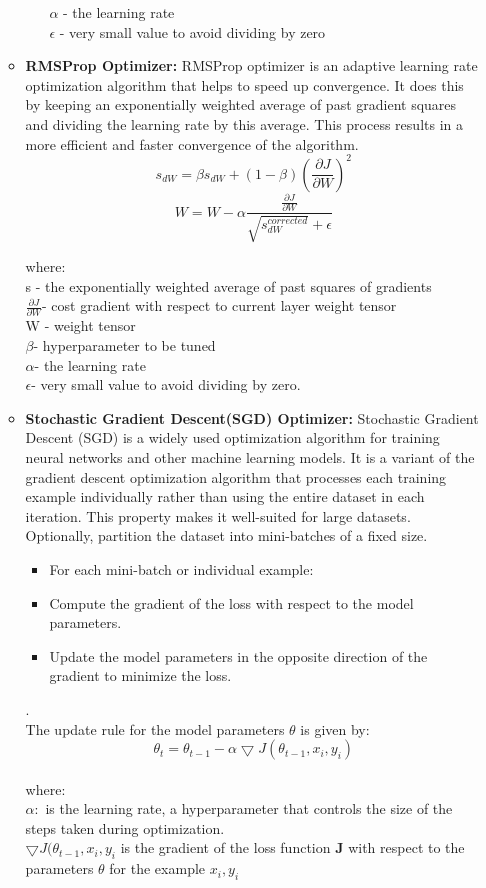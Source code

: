 \begin{itemize}
\begin{itemize}
\begin{itemize}
        $\alpha$ - the learning rate\\
        $\epsilon$ - very small value to avoid dividing by zero\\
    \end{itemize}
    \item \textbf{RMSProp Optimizer: } RMSProp optimizer is an adaptive learning rate optimization algorithm that helps to speed up convergence. It does this by keeping an exponentially weighted average of past gradient squares and dividing the learning rate by this average. This process results in a more efficient and faster convergence of the algorithm.
    \[
    s_{dW} = \beta s_{dW} + (1-\beta)\left(\frac{\partial J}{\partial W}\right)^{2}
    \]
    \[
    W = W-\alpha\frac{\frac{\partial J}{\partial W}}{\sqrt{s_{dW}^{corrected}}+ \epsilon}
    \]
    
    where: \\
    s - the exponentially weighted average of past squares of gradients\\
    $\frac{\partial J}{\partial W}$-  cost gradient with respect to current layer weight tensor\\
    W - weight tensor\\
    $\beta$- hyperparameter to be tuned\\
    $\alpha$- the learning rate\\
    $\epsilon$- very small value to avoid dividing by zero.
    \item \textbf{Stochastic Gradient Descent(SGD) Optimizer: } Stochastic Gradient Descent (SGD) is a widely used optimization algorithm for training neural networks and other machine learning models. It is a variant of the gradient descent optimization algorithm that processes each training example individually rather than using the entire dataset in each iteration. This property makes it well-suited for large datasets. Optionally, partition the dataset into mini-batches of a fixed size.
    \begin{itemize}
        \item For each mini-batch or individual example:
        \item Compute the gradient of the loss with respect to the model parameters.
        \item Update the model parameters in the opposite direction of the gradient to minimize the loss.
    \end{itemize}.\\
    The update rule for the model parameters $\theta$ is given by:
    \[
    \theta_{t} = \theta_{t-1}-\alpha\bigtriangledown J(\theta_{t-1},x_{i}, y_{i})
    \]\\
    where: \\
    $\alpha : $  is the learning rate, a hyperparameter that controls the size of the steps taken during optimization.\\
    $\bigtriangledown J(\theta_{t-1},x_{i}, y_{i}$ is the gradient of the loss function $\mathbf{J}$ with respect to the parameters $\theta$ for the example $x_{i}, y_{i}$
\end{itemize}




\end{itemize}
